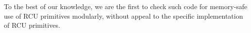 To the best of our knowledge, we are the first to check such code for memory-safe use of RCU primitives modularly, without appeal to the specific implementation of RCU primitives.
\begin{comment}
The most subtle aspect of the deletion is the final step in the case the node $H_1$ to remove has both children.  In this case, the value $H'_1$ of the left-most node of $H_1$'s right child --- the next element in the collection order --- is copied into a new node, which is then used to \emph{replace} node $H_1$: the replacement's fields exactly match $H_1$'s except for the data (\textsc{T-Replace} via $\N_1 = \N_2$), and the parent is updated to reference the replacement, unlinking $H_1$. At this point, there are two nodes with value $H'_1$ in the tree (\textit{weak} BST property of the Citrus~\cite{Arbel:2014:CUR:2611462.2611471}): the replacement node, and what was the left-most node under $H_1$'s right child. This latter (original) node for $H'_1$ must be unlinked, which is simplified because by being left-most the left child is null, avoiding another round of replacement (\textsc{T-UnlinkH} via $\forall_{f\in dom(\N_1)} \ldotp f\neq f_2 \implies (\N_1(f) = \textsf{null}$).
The complexity in checking safety here is that once $H_1$ is found, another loop is used to find $H'_1$ and its parent (since that node will later be removed as well).
After $H'_1$ is found, there are \emph{two} local unlinking operations, at different depths of the tree.  This is why the type system must keep separate abstract iteration counts for traversals in loops --- these indices act like multiple cursors into the data structure, and allow the types to carry enough information to keep those changes separate and ensure neither introduces a cycle.

To the best of our knowledge, we are the first to check such code for memory-safe use of RCU primitives modularly, without appeal to the specific implementation of RCU primitives.
\end{comment}
